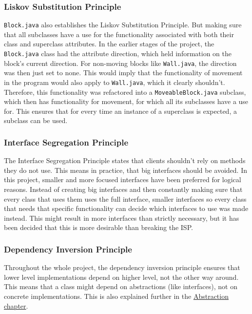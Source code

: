 \documentclass[a4paper,5pt]{article}
\begin{document}
\subsubsection{Liskov Substitution Principle}
\texttt{Block.java} also establishes the Liskov Substitution Principle. But making sure that all subclasses have a use for the functionality associated with both their class and superclass attributes. In the earlier stages of the project, the \texttt{Block.java} class had the attribute direction, which held information on the block’s current direction. For non-moving blocks like \texttt{Wall.java}, the direction was then just set to none. This would imply that the functionality of movement in the program would also apply to \texttt{Wall.java}, which it clearly shouldn’t. Therefore, this functionality was refactored into a \texttt{MoveableBlock.java} subclass, which then has functionality for movement, for which all its subclasses have a use for. This ensures that for every time an instance of a superclass is expected, a subclass can be used.\\

\subsubsection{Interface Segregation Principle}
The Interface Segregation Principle states that clients shouldn't rely on methods they do not use. This means in practice, that big interfaces should be avoided. In this project, smaller and more focused interfaces have been preferred for logical reasons. Instead of creating big interfaces and then constantly making sure that every class that uses them uses the full interface, smaller interfaces so every class that needs that specific functionality can decide which interfaces to use was made instead. This might result in more interfaces than strictly necessary, but it has been decided that this is more desirable than breaking the ISP.

\subsubsection{Dependency Inversion Principle}
Throughout the whole project, the dependency inversion principle ensures that lower level implementations depend on higher level, not the other way around. This means that a class might depend on abstractions (like interfaces), not on concrete implementations. This is also explained further in the \hyperref[sec:abstraction]{Abstraction chapter}.
\end{document}
